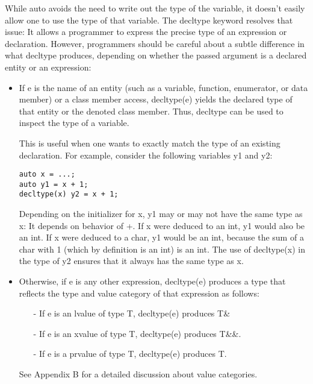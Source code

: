 While auto avoids the need to write out the type of the variable, it doesn’t easily allow one to use the type of that variable. The decltype keyword resolves that issue: It allows a programmer to express the precise type of an expression or declaration. However, programmers should be careful about a subtle difference in what decltype produces, depending on whether the passed argument is a declared entity or an expression:

\begin{itemize}
\item 
If e is the name of an entity (such as a variable, function, enumerator, or data member) or a class member access, decltype(e) yields the declared type of that entity or the denoted class member. Thus, decltype can be used to inspect the type of a variable.

This is useful when one wants to exactly match the type of an existing declaration. For example, consider the following variables y1 and y2:

\begin{lstlisting}[style=styleCXX]
auto x = ...;
auto y1 = x + 1;
decltype(x) y2 = x + 1;
\end{lstlisting}

Depending on the initializer for x, y1 may or may not have the same type as x: It depends on behavior of +. If x were deduced to an int, y1 would also be an int. If x were deduced to a char, y1 would be an int, because the sum of a char with 1 (which by definition is an int) is an int. The use of decltype(x) in the type of y2 ensures that it always has the same type as x.

\item 
Otherwise, if e is any other expression, decltype(e) produces a type that reflects the type and value category of that expression as follows:

\begin{itemize}
\item[-]
If e is an lvalue of type T, decltype(e) produces T\&

\item[-]
If e is an xvalue of type T, decltype(e) produces T\&\&.

\item[-]
If e is a prvalue of type T, decltype(e) produces T.
\end{itemize}

See Appendix B for a detailed discussion about value categories. 

\end{itemize}

